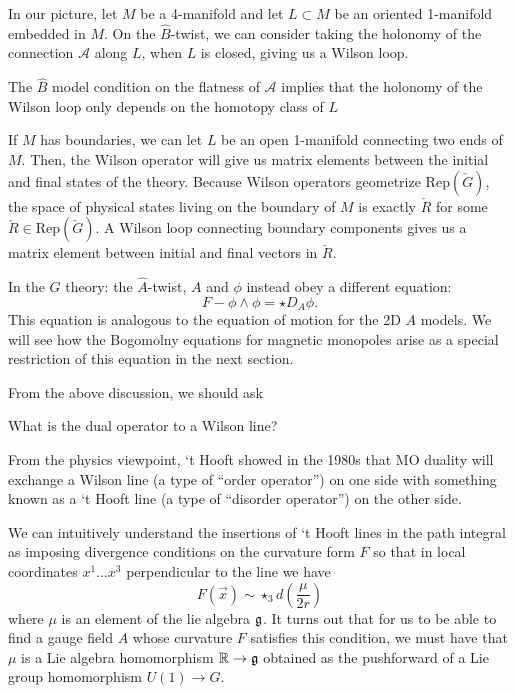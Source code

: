 	In our picture, let $M$ be a 4-manifold and let $L \subset M$ be an oriented 1-manifold embedded in $M$. On the $\hat B$-twist, we can consider taking the holonomy of the connection $\mathcal A$ along $L$, when $L$ is closed, giving us a Wilson loop. 
	\begin{prop}
		The $\hat B$ model condition on the flatness of $\mathcal A$ implies that the holonomy of the Wilson loop only depends on the homotopy class of $L$
	\end{prop}
	If $M$ has boundaries, we can let $L$ be an open 1-manifold connecting two ends of $M$. Then, the Wilson operator will give us matrix elements between the initial and final states of the theory. Because Wilson operators geometrize $\mathrm{Rep}(\check G)$, the space of physical states living on the boundary of $M$ is exactly $\check R$ for some $\check R \in \mathrm{Rep}(\check G)$. A Wilson loop connecting boundary components gives us a matrix element between initial and final vectors in $\check R$.
	
	In the $G$ theory: the $\hat A$-twist, $A$ and $\phi$ instead obey a different equation:
	\begin{equation}
		F - \phi \wedge \phi = \star D_A \phi.
	\end{equation}
	This equation is analogous to the equation of motion for the 2D $A$ models. We will see how the Bogomolny equations for magnetic monopoles arise as a special restriction of this equation in the next section.

	From the above discussion, we should ask 
	\begin{ques}
		What is the dual operator to a Wilson line?
	\end{ques}
	From the physics viewpoint, `t Hooft showed in the 1980s that MO duality will exchange a Wilson line (a type of ``order operator'') on one side with something known as a `t Hooft line (a type of ``disorder operator'') on the other side.
	
	We can intuitively understand the insertions of `t Hooft lines in the path integral as imposing divergence conditions on the curvature form $F$ so that in local coordinates $x^1 \dots x^3$ perpendicular to the line we have
		\begin{equation}\label{eq:Amod}
			F(\vec{x}) \sim \star_3 d\left( \frac{\mu}{2r} \right)
		\end{equation}
		where $\mu$ is an element of the lie algebra $\frak g$. It turns out that for us to be able to find a gauge field $A$ whose curvature $F$ satisfies this condition, we must have that $\mu$ is a Lie algebra homomorphism $\mathbb R \to \frak g$ obtained as the pushforward of a Lie group homomorphism $U(1) \to G$.
		
